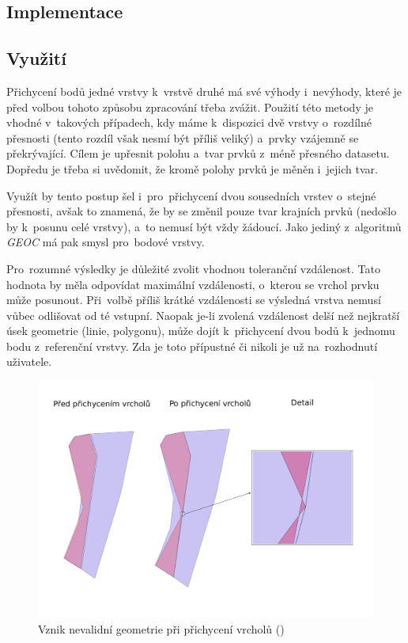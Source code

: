 
\subsection{Implementace}
\label{vs-implementace}

\subsection{Využití}
\label{vs-vyuziti}

Přichycení bodů jedné vrstvy k~vrstvě druhé má své výhody i~nevýhody, které 
je před volbou tohoto způsobu zpracování třeba zvážit. Použití této metody 
je vhodné v~takových případech, kdy máme k~dispozici dvě vrstvy o~rozdílné 
přesnosti (tento rozdíl však nesmí být příliš veliký) a~prvky vzájemně se 
překrývající. Cílem je upřesnit polohu a~tvar prvků z~méně přesného datasetu. 
Dopředu je třeba si uvědomit, že kromě polohy prvků je měněn i~jejich tvar.

Využít by tento postup šel i~pro~přichycení dvou sousedních vrstev o~stejné 
přesnosti, avšak to znamená, že by se změnil pouze tvar krajních prvků 
(nedošlo by k~posunu celé vrstvy), a~to nemusí být vždy žádoucí. Jako jediný
z~algoritmů \textit{GEOC} má pak smysl pro~bodové vrstvy.

Pro~rozumné výsledky je důležité zvolit vhodnou toleranční vzdálenost. Tato 
hodnota by měla odpovídat maximální vzdálenosti, o~kterou se vrchol prvku 
může posunout. Při~volbě příliš krátké vzdálenosti se výsledná vrstva nemusí 
vůbec odlišovat od té vstupní. Naopak \mbox{je-li} zvolená vzdálenost delší 
než nejkratší úsek geometrie (linie, polygonu), může dojít k~přichycení dvou 
bodů k~jednomu bodu z~referenční vrstvy. Zda je toto přípustné či nikoli je 
už na~rozhodnutí uživatele.

\label{vsinvalid}
  \begin{figure}[hbt]
    \centering
      \includegraphics[width=350pt]{./pictures/vs-invalid.pdf}
      \caption{Vznik nevalidní geometrie při přichycení vrcholů ()}
      \label{fig:vs-nevalidni}
  \end{figure} 

